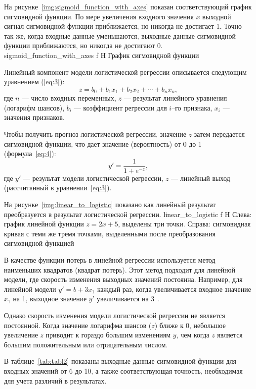 На рисунке~\ref{img:sigmoid_function_with_axes} показан соответствующий график сигмовидной функции.
По мере увеличения входного значения $x$ выходной сигнал сигмовидной функции приближается, но никогда не достигает 1.
Точно так же, когда входные данные уменьшаются, выходные данные сигмовидной функции приближаются, но никогда не достигают 0.
{sigmoid_function_with_axes}
{f}
{H}
{\textwidth}
{График сигмовидной функции}

Линейный компонент модели логистической регрессии описывается следующим уравнением (\ref{eq:3}):
\begin{equation}
    z = b_0 + b_1 x_1 + b_2 x_2 +\cdots + b_n x_n,
    \label{eq:3}
\end{equation}
где $n$ --- число входных переменных, $z$ --- результат линейного уравнения (логарифм шансов), $b_i$ --- коэффициент регрессии для $i$--го признака, $x_i$ --- значения признаков.

Чтобы получить прогноз логистической регрессии, значение $z$ затем передается сигмовидной функции, что дает значение (вероятность) от 0 до 1 (формула~\ref{eq:4}):
\begin{equation}
    y' = \frac{1}{1 + e^{-z}},
    \label{eq:4}
\end{equation}
где $y'$ --- результат модели логистической регрессии, $z$ --- линейный выход (рассчитанный в уравнении~\ref{eq:3}).

На рисунке~\ref{img:linear_to_logistic} показано как линейный результат преобразуется в результат логистической регрессии.
{linear_to_logistic}
{f}
{H}
{\textwidth}
{Слева: график линейной функции $z = 2x + 5$, выделены три точки. Справа: сигмовидная кривая с теми же тремя точками, выделенными после преобразования сигмовидной функцией}

В качестве функции потерь в линейной регрессии используется метод наименьших квадратов (квадрат потерь).
Этот метод подходит для линейной модели, где скорость изменения выходных значений постоянна.
Например, для линейной модели $y' = b + 3 x_1$ каждый раз, когда увеличивается входное значение $x_1$ на 1, выходное значение $y'$ увеличивается на 3~\cite{google2}.

Однако скорость изменения модели логистической регрессии не является постоянной.
Когда значение логарифма шансов ($z$) ближе к 0, небольшое увеличение $z$ приводит к гораздо большим изменениям $y$, чем когда $z$ является большим положительным или отрицательным числом.

В таблице~\ref{tab:tabl2} показаны выходные данные сигмовидной функции для входных значений от 6 до 10, а также соответствующая точность, необходимая для учета различий в результатах.

